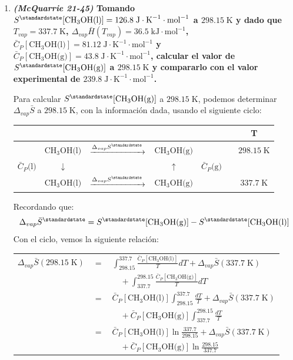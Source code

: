 \documentclass[a4paper,12pt]{article}
\begin{document}
\begin{enumerate}
\begin{enumerate}
 \end{enumerate}

 \item \textbf{\textit{(McQuarrie 21-45)} Tomando $S^\standardstate[\mbox{CH}_3\mbox{OH(l)}]=126.8\;\mbox{J}\cdot\mbox{K}^{-1}\cdot\mbox{mol}^{-1}$ a $298.15\;\mbox{K}$ y dado que $T_{vap}=337.7\;\mbox{K}$, $\Delta_{vap}\bar{H}(T_{vap})=36.5\;\mbox{kJ}\cdot\mbox{mol}^{-1}$, \\ $\bar{C}_P[\mbox{CH}_3\mbox{OH(l)}]=81.12\;\mbox{J}\cdot\mbox{K}^{-1}\cdot\mbox{mol}^{-1}$ y $\bar{C}_P[\mbox{CH}_3\mbox{OH(g)}]=43.8\;\mbox{J}\cdot\mbox{K}^{-1}\cdot\mbox{mol}^{-1}$, calcular el valor de $S^\standardstate[\mbox{CH}_3\mbox{OH(g)}]$ a $298.15\;\mbox{K}$ y compararlo con el valor experimental de $239.8\;\mbox{J}\cdot\mbox{K}^{-1}\cdot\mbox{mol}^{-1}$.} %

Para calcular $S^\standardstate[\mbox{CH}_3\mbox{OH(g)}]$ a $298.15\;\mbox{K}$, podemos determinar $\Delta_{vap}\bar{S}$ a $298.15\;\mbox{K}$, con la informaci\'on dada, usando el siguiente ciclo: \\
\begin{center}
\begin{tabular}{r c c c l c | c}
& & & & & \quad & T \\\hline
& $\mbox{CH}_3\mbox{OH(l)}$ & $\xrightarrow{\Delta_{vap}S^\standardstate}$ & $\mbox{CH}_3\mbox{OH(g)}$ & & \quad\quad & $298.15\;\mbox{K}$ \\
 ${\bar{C}_P\mbox{(l)}}$ & $\downarrow$ & & $\uparrow$ & ${\bar{C}_P\mbox{(g)}}$ & \quad\quad & \\
& $\mbox{CH}_3\mbox{OH(l)}$ & $\xrightarrow{\Delta_{vap}S^\standardstate}$ & $\mbox{CH}_3\mbox{OH(g)}$ & & \quad\quad & $337.7\;\mbox{K}$ \\\hline
\end{tabular}
\end{center}

Recordando que:
$$\Delta_{vap}\bar{S}^\standardstate=S^\standardstate[\mbox{CH}_3\mbox{OH(g)}]-S^\standardstate[\mbox{CH}_3\mbox{OH(l)}]$$
Con el ciclo, vemos la siguiente relaci\'on: \\
\begin{center}
\begin{tabular}{r c l}
$\Delta_{vap}\bar{S}(298.15\;\mbox{K})$ & $=$ & $\int_{298.15}^{337.7}\frac{\bar{C}_P[\mbox{CH}_3\mbox{OH(l)}]}{T}dT+\Delta_{vap}\bar{S}(337.7\;\mbox{K})$ \\
& & $\quad+\int_{337.7}^{298.15}\frac{\bar{C}_P[\mbox{CH}_3\mbox{OH(g)}]}{T}dT$ \\
& $=$ & $\bar{C}_P[\mbox{CH}_3\mbox{OH(l)}]\int_{298.15}^{337.7}\frac{dT}{T}+\Delta_{vap}\bar{S}(337.7\;\mbox{K})$ \\
& & $\quad+\bar{C}_P[\mbox{CH}_3\mbox{OH(g)}]\int_{337.7}^{298.15}\frac{dT}{T}$ \\
& $=$ & $\bar{C}_P[\mbox{CH}_3\mbox{OH(l)}]\ln\frac{337.7}{298.15}+\Delta_{vap}\bar{S}(337.7\;\mbox{K})$ \\
& & $\quad+\bar{C}_P[\mbox{CH}_3\mbox{OH(g)}]\ln\frac{298.15}{337.7}$
\end{tabular}
\end{center}


\end{enumerate}
\end{document}
